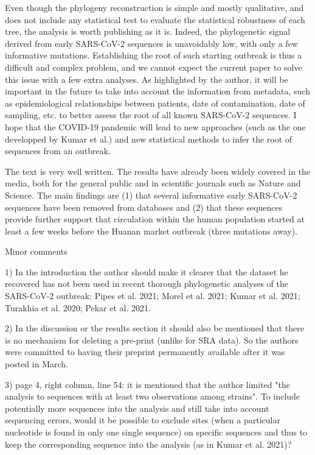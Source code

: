 \documentclass[11pt, oneside]{article}   	%
\begin{document}
Even though the phylogeny reconstruction is simple and mostly qualitative, and does not include any statistical test to evaluate the statistical robustness of each tree, the analysis is worth publishing as it is. Indeed, the phylogenetic signal derived from early SARS-CoV-2 sequences is unavoidably low, with only a few informative mutations. Establishing the root of such starting outbreak is thus a difficult and complex problem, and we cannot expect the current paper to solve this issue with a few extra analyses. As highlighted by the author, it will be important in the future to take into account the information from metadata, such as epidemiological relationships between patients, date of contamination, date of sampling, etc. to better assess the root of all known SARS-CoV-2 sequences. I hope that the COVID-19 pandemic will lead to new approaches (such as the one developped by Kumar et al.) and new statistical methods to infer the root of sequences from an outbreak.

The text is very well written. The results have already been widely covered in the media, both for the general public and in scientific journals such as Nature and Science. The main findings are (1) that several informative early SARS-CoV-2 sequences have been removed from databases and (2) that these sequences provide further support that circulation within the human population started at least a few weeks before the Huanan market outbreak (three mutations away).

Minor comments

1) In the introduction the author should make it clearer that the dataset he recovered has not been used in recent thorough phylogenetic analyses of the SARS-CoV-2 outbreak: Pipes et al. 2021; Morel et al. 2021; Kumar et al. 2021; Turakhia et al. 2020; Pekar et al. 2021.

2) In the discussion or the results section it should also be mentioned that there is no mechanism for deleting a pre-print (unlike for SRA data). So the authors were committed to having their preprint permanently available after it was posted in March.

3) page 4, right column, line 54: it is mentioned that the author limited "the analysis to sequences with at least two observations among strains". To include potentially more sequences into the analysis and still take into account sequencing errors, would it be possible to exclude sites (when a particular nucleotide is found in only one single sequence) on specific sequences and thus to keep the corresponding sequence into the analysis (as in Kumar et al. 2021)? 
\end{document}
